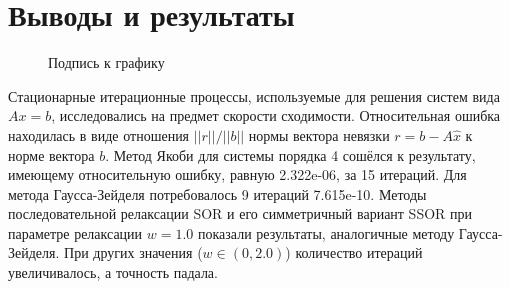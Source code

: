 \section{Выводы и результаты}

\begin{figure}[ht]
\caption{Подпись к графику}
\end{figure}



Стационарные итерационные процессы, используемые для решения систем вида $Ax=b$, исследовались на предмет скорости сходимости. Относительная ошибка находилась в виде отношения $||r|| / ||b||$ нормы вектора невязки $r = b - A\hat{x}$ к норме вектора $b$.  
Метод Якоби для системы порядка 4 сошёлся к результату, имеющему относительную ошибку, равную 2.322e-06, за 15 итераций. 
Для метода Гаусса-Зейделя потребовалось 9 итераций 7.615e-10. 
Методы последовательной релаксации SOR и его симметричный вариант SSOR при параметре релаксации $w=1.0$ показали результаты, аналогичные методу Гаусса-Зейделя. При других значения ($w \in (0, 2.0)$) количество итераций увеличивалось, а точность падала.




